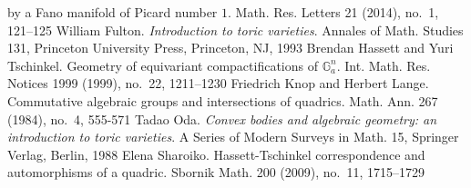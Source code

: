 \documentclass[a4paper,reqno,12pt]{amsart}
\theoremstyle{definition}
\begin{document}
\begin{thebibliography}{99}
by a Fano manifold of Picard number $1$. Math. Res. Letters 21 (2014), no.~1, 121--125
%
William Fulton. \emph{Introduction to toric varieties}. Annales of Math. Studies 131,
Princeton University Press, Princeton, NJ, 1993
%
Brendan Hassett and Yuri Tschinkel. Geometry of equivariant compactifications of $\mathbb{G}^n_a$.
Int. Math. Res. Notices 1999 (1999), no.~22, 1211--1230
%
Friedrich  Knop and Herbert Lange. Commutative algebraic groups and intersections of quadrics. Math. Ann. 267 (1984), no.~4, 555-571
%
Tadao Oda. \emph{Convex bodies and algebraic geometry: an introduction to toric varieties}. A Series of Modern Surveys in Math. 15, Springer Verlag, Berlin, 1988
%
Elena Sharoiko. Hassett-Tschinkel correspondence and automorphisms of a quadric.
Sbornik Math. 200 (2009), no.~11, 1715--1729

\end{thebibliography}
\end{document}
